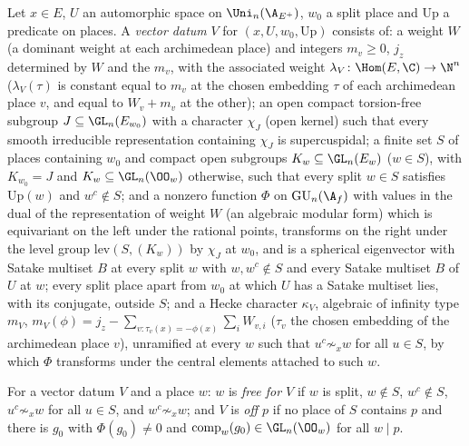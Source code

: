 \begin{definition}\label{pf:geo:vec}
Let $x\in E$, $U$ an automorphic space on $\Uni_n(\A_{E^+})$, $w_0$ a split place and $\mathrm{Up}$ a predicate on places. A
\emph{vector datum} $V$ for $(x,U,w_0,\mathrm{Up})$ consists of: a weight $W$ (a dominant weight at each archimedean place)
and integers $m_v\ge0$, $j_z$ determined by $W$ and the $m_v$, with the associated weight
$\lambda_V\colon\Hom(E,\C)\to\N^n$ ($\lambda_V(\tau)$ is constant equal to $m_v$ at the chosen embedding $\tau$ of each archimedean place
$v$, and equal to $W_v+m_v$ at the other); an open compact torsion-free subgroup $J\subseteq\GL_n(E_{w_0})$ with a character
$\chi_J$ (open kernel) such that every smooth irreducible representation containing $\chi_J$ is supercuspidal; a finite
set $S$ of places containing $w_0$ and compact open subgroups $K_w\subseteq\GL_n(E_w)$ ($w\in S$), with $K_{w_0}=J$ and
$K_w\subseteq\GL_n(\OO_w)$ otherwise, such that every split $w\in S$ satisfies $\mathrm{Up}(w)$ and $w^c\notin S$; and a nonzero
function $\Phi$ on $\geoGU_n(\A_f)$ with values in the dual of the representation of weight $W$ (an algebraic modular form)
which is equivariant on the left under the rational points, transforms on the right under the level group
$\mathrm{lev}(S,(K_w))$ by $\chi_J$ at $w_0$, and is a spherical eigenvector with Satake multiset $B$ at every split $w$ with
$w,w^c\notin S$ and every Satake multiset $B$ of $U$ at $w$; every split place apart from $w_0$ at which $U$ has a Satake
multiset lies, with its conjugate, outside $S$; and a Hecke character $\kappa_V$, algebraic of infinity type
$m_V$, $m_V(\phi)=j_z-\sum_{v:\tau_v(x)=-\phi(x)}\sum_iW_{v,i}$ ($\tau_v$ the chosen embedding of the archimedean place $v$), unramified at
every $w$ such that $u^c\not\sim_xw$ for all $u\in S$, by which $\Phi$ transforms under the central elements attached to such $w$.
\end{definition}

For a vector datum $V$ and a place $w$: $w$ is \emph{free for $V$} if $w$ is split, $w\notin S$, $w^c\notin S$,
$u^c\not\sim_xw$ for all $u\in S$, and $w^c\not\sim_xw$; and $V$ is \emph{off $p$} if no place of $S$ contains $p$ and there is
$g_0$ with $\Phi(g_0)\ne0$ and $\mathrm{comp}_w(g_0)\in\GL_n(\OO_w)$ for all $w\mid p$.

